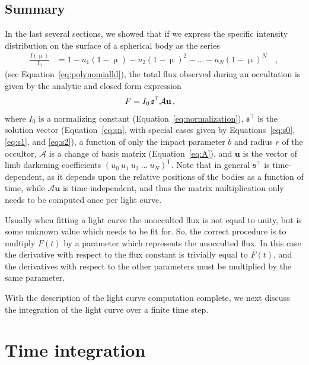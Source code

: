 \documentclass[modern,trackchanges]{aastex63}
\begin{document}
%
\pagebreak %

\subsection{Summary}
\label{sec:summary}
In the last several sections, we showed that if we express the specific intensity distribution
on the surface of a spherical body as the series
%
\begin{align}
\frac{I(\upmu)}{I_0} &= 1 - u_1 (1 - \upmu) - u_2 (1 - \upmu)^2 - ... - u_{N}(1 - \upmu)^{N} \quad,
\end{align}
%
(see Equation~\ref{eq:polynomialld}),
the total flux observed during an occultation is given by the analytic and closed form
expression
%
\begin{align}
    \label{eq:occint_greens_summary}
    F &= I_0 \, \mathfrak{s}^\mathsf{T} \mathcal{A} \bvec{u} \quad ,
\end{align}
%
where $I_0$ is a normalizing constant (Equation~\ref{eq:normalization}),
$\mathfrak{s}^\top$ is the solution vector (Equation~\ref{eq:sn}, with special
cases given by Equations~\ref{eq:s0}, \ref{eq:s1}, and \ref{eq:s2}),
a function of only the impact parameter
$b$ and radius $r$ of the occultor, $\mathcal{A}$ is a change of basis
matrix (Equation~\ref{eq:A}), and $\mathbf{u}$ is the vector of limb
darkening coefficients $(u_0 \ u_1 \ u_2 \ ... \ u_N)^\mathsf{T}$.
Note that in general $\mathfrak{s}^\top$ is time-dependent, as it depends
upon the relative positions of the bodies as a function of time, while
$\mathcal{A}\mathbf{u}$ is time-independent, and thus the matrix
multiplication only needs to be computed once per light curve.

Usually when fitting a light curve the unocculted flux is not equal
to unity, but is some unknown value which needs to be fit for.  
So, the correct procedure is to multiply $F(t)$ by a parameter which 
represents the unocculted flux.
In this case the derivative with respect to the flux constant is trivially 
equal to $F(t)$, and the derivatives with respect to the other parameters 
must be multiplied by the same parameter.

With the description of the light curve computation complete, we next discuss
the integration of the light curve over a finite time step.

\section{Time integration} \label{sec:time}
\end{document}
